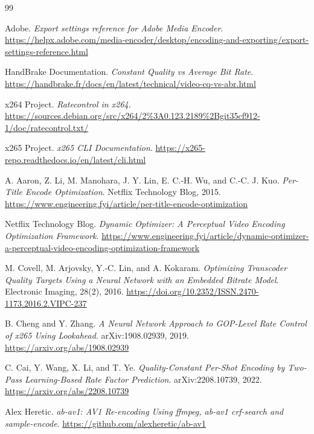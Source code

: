 \documentclass[UTF8,a4paper,11pt]{ctexart}
\begin{document}
\begin{thebibliography}{99}

Adobe.
\newblock \textit{Export settings reference for Adobe Media Encoder}.
\newblock \url{https://helpx.adobe.com/media-encoder/desktop/encoding-and-exporting/export-settings-reference.html}

HandBrake Documentation.
\newblock \textit{Constant Quality vs Average Bit Rate}.
\newblock \url{https://handbrake.fr/docs/en/latest/technical/video-cq-vs-abr.html}

x264 Project.
\newblock \textit{Ratecontrol in x264}.
\newblock \url{https://sources.debian.org/src/x264/2%3A0.123.2189%2Bgit35cf912-1/doc/ratecontrol.txt/}

x265 Project.
\newblock \textit{x265 CLI Documentation}.
\newblock \url{https://x265-repo.readthedocs.io/en/latest/cli.html}

A. Aaron, Z. Li, M. Manohara, J. Y. Lin, E. C.-H. Wu, and C.-C. J. Kuo.
\newblock \textit{Per-Title Encode Optimization}.
\newblock Netflix Technology Blog, 2015.
\newblock \url{https://www.engineering.fyi/article/per-title-encode-optimization}

Netflix Technology Blog.
\newblock \textit{Dynamic Optimizer: A Perceptual Video Encoding Optimization Framework}.
\newblock \url{https://www.engineering.fyi/article/dynamic-optimizer-a-perceptual-video-encoding-optimization-framework}

M. Covell, M. Arjovsky, Y.-C. Lin, and A. Kokaram.
\newblock \textit{Optimizing Transcoder Quality Targets Using a Neural Network with an Embedded Bitrate Model}.
\newblock Electronic Imaging, 28(2), 2016.
\newblock \url{https://doi.org/10.2352/ISSN.2470-1173.2016.2.VIPC-237}

B. Cheng and Y. Zhang.
\newblock \textit{A Neural Network Approach to GOP-Level Rate Control of x265 Using Lookahead}.
\newblock arXiv:1908.02939, 2019.
\newblock \url{https://arxiv.org/abs/1908.02939}

C. Cai, Y. Wang, X. Li, and T. Ye.
\newblock \textit{Quality-Constant Per-Shot Encoding by Two-Pass Learning-Based Rate Factor Prediction}.
\newblock arXiv:2208.10739, 2022.
\newblock \url{https://arxiv.org/abs/2208.10739}

Alex Heretic.
\newblock \textit{ab-av1: AV1 Re-encoding Using ffmpeg, ab-av1 crf-search and sample-encode}.
\newblock \url{https://github.com/alexheretic/ab-av1}


\end{thebibliography}
\end{document}
